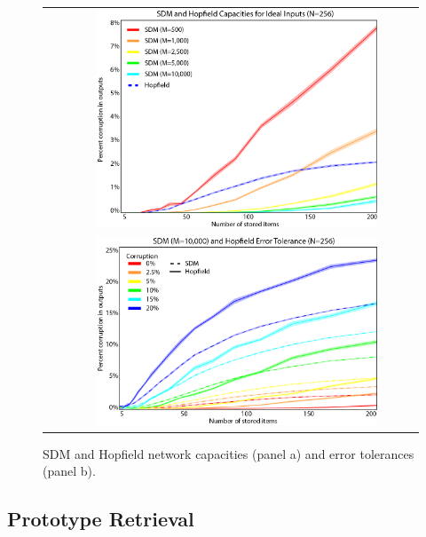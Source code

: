 \documentclass[10pt,letterpaper]{article}
\begin{document}
\begin{center}
\begin{figure}[ht!]
{
	\hfill{}
	\begin{tabular}{ l c }
	\raisebox{3.75in}{(a)} &
		\includegraphics[width=0.8\textwidth]{./figures/capacity-edit.png} \vspace{20bp}
		\\
	\raisebox{3.2in}{(b)} &
		\includegraphics[width=0.8\textwidth]{./figures/tolerance-edit.png} 
	\end{tabular}
}
\hfill{}
\caption{SDM and Hopfield network capacities (panel a) and error tolerances (panel b).}
\label{capacityAndErrorTolerance}
\end{figure}
\end{center}


\subsection{Prototype Retrieval}
\end{document}
